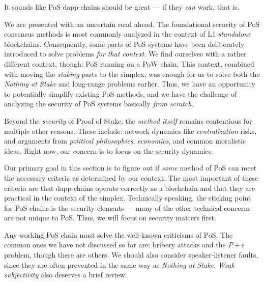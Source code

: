 
\newcommand{\ppe}{\ensuremath{P + \varepsilon}\xspace}
\newcommand{\thePpeProblem}{the \ppe problem\xspace}
\newcommand{\ThePpeProblem}{The \ppe problem\xspace}

It sounds like PoS dapp-chains should be great --- if they \emph{can} work, that is.

We are presented with an uncertain road ahead.
The foundational security of PoS consensus methods is most commonly analyzed in the context of L1 \emph{standalone} blockchains.
Consequently, some parts of PoS systems have been deliberately introduced to solve problems \emph{for that context}.
We find ourselves with a rather different context, though: PoS running on a PoW chain.
This context, combined with moving the \emph{staking} parts to the simplex, was enough for us to solve both the \emph{Nothing at Stake} and long-range problems earlier.
Thus, we have an opportunity to potentially simplify existing PoS methods, and we have the challenge of analyzing the security of PoS systems basically \emph{from scratch}.

Beyond the \emph{security} of Proof of Stake, the \emph{method itself} remains contentious for multiple other reasons.
These include: network dynamics like \emph{centralization} risks, and arguments from \emph{political philosophies}, \emph{economics}, and common moralistic ideas.
Right now, our concern is to focus on the security dynamics.

Our primary goal in this section is to figure out if \emph{some} method of PoS can meet the necessary criteria as determined by our context.
The most important of these criteria are that dapp-chains operate correctly as a blockchain and that they are practical in the context of the simplex.
Technically speaking, the sticking point for PoS chains is the security elements --- many of the other technical concerns are not unique to PoS.
Thus, we will focus on security matters first.

Any working PoS chain must solve the well-known criticisms of PoS.
The common ones we have not discussed so far are: bribery attacks and \thePpeProblem, though there are others.
We should also consider speaker-listener faults, since they are often prevented in the same way as \emph{Nothing at Stake}.
\emph{Weak subjectivity} also deserves a brief review.


